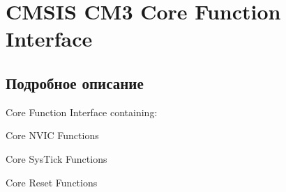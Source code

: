 \hypertarget{group___c_m_s_i_s___c_m3___core___function_interface}{}\section{C\+M\+S\+IS C\+M3 Core Function Interface}
\label{group___c_m_s_i_s___c_m3___core___function_interface}


\subsection{Подробное описание}
Core Function Interface containing\+:
\begin{DoxyItemize}
\item Core N\+V\+IC Functions
\item Core Sys\+Tick Functions
\item Core Reset Functions 
\end{DoxyItemize}